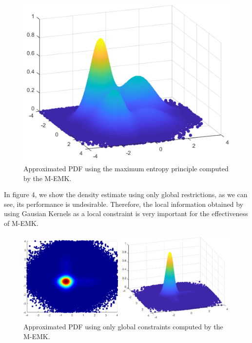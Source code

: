 \documentclass[conference]{IEEEtran}
\begin{document}
\begin{figure}[H]
	\centering
	\includegraphics[width=1\linewidth]{pdf3D}
	\caption{Approximated PDF using the maximum entropy principle computed by the M-EMK.}
	\label{fig:mesh1}
\end{figure}

In figure 4, we show the density estimate using only global restrictions, as we can see, its performance is undesirable. Therefore, the local information obtained by using Gausian Kernels as a local constraint is very important for the effectiveness of M-EMK.
	
\begin{figure}[H]
	\centering
	\includegraphics[width=1\linewidth]{OnlyGlobalConstMatching}
	\caption{Approximated PDF using only global constraints computed by the M-EMK.}
	\label{fig:mesh1}
\end{figure}
\end{document}
